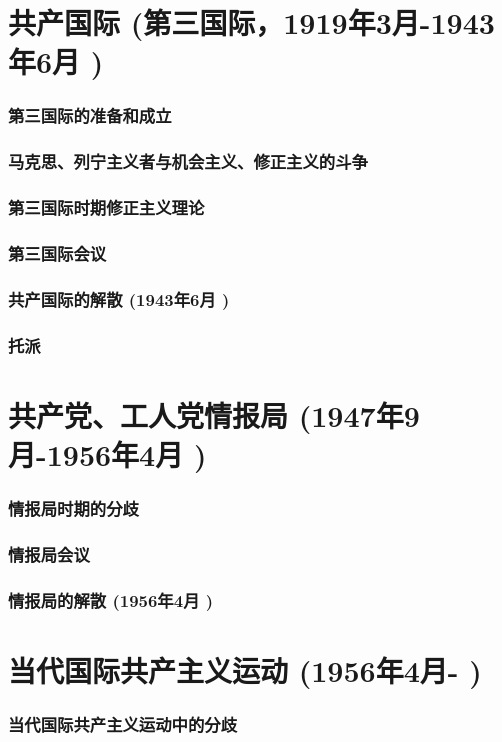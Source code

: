 \documentclass[UTF8]{../RepresentationUniverse}
\begin{document}
\section{共产国际 (第三国际，1919年3月-1943年6月 )}
    \subsubsection{第三国际的准备和成立}
    \subsubsection{马克思、列宁主义者与机会主义、修正主义的斗争}
    \subsubsection{第三国际时期修正主义理论}
    \subsubsection{第三国际会议}
    \subsubsection{共产国际的解散 (1943年6月 )}
    \subsubsection{托派}

\section{共产党、工人党情报局 (1947年9月-1956年4月 )}
    \subsubsection{情报局时期的分歧}
    \subsubsection{情报局会议}
    \subsubsection{情报局的解散 (1956年4月 )}

\section{当代国际共产主义运动 (1956年4月- )}
    \subsubsection{当代国际共产主义运动中的分歧}
\end{document}
